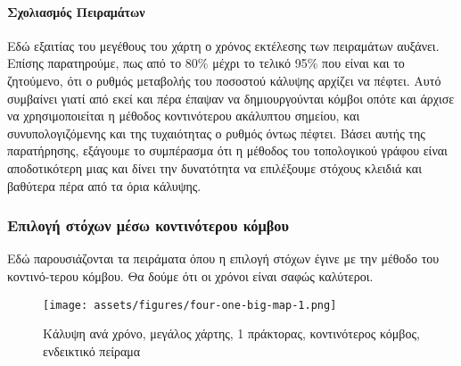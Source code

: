\paragraph{Σχολιασμός Πειραμάτων}

Εδώ εξαιτίας του μεγέθους του χάρτη ο χρόνος εκτέλεσης των πειραμάτων αυξάνει. Επίσης παρατηρούμε, πως από το 80\% μέχρι το τελικό 95\% που είναι και το ζητούμενο, ότι ο ρυθμός μεταβολής του ποσοστού κάλυψης αρχίζει να πέφτει. Αυτό συμβαίνει γιατί από εκεί και πέρα έπαψαν να δημιουργούνται κόμβοι οπότε και άρχισε να χρησιμοποιείται η μέθοδος κοντινότερου ακάλυπτου σημείου, και συνυπολογιζόμενης και της τυχαιότητας ο ρυθμός όντως πέφτει. Βάσει αυτής της παρατήρησης, εξάγουμε το συμπέρασμα ότι η μέθοδος του τοπολογικού γράφου είναι αποδοτικότερη μιας και δίνει την δυνατότητα να επιλέξουμε στόχους κλειδιά και βαθύτερα πέρα από τα όρια κάλυψης.



\subsubsection{Επιλογή στόχων μέσω κοντινότερου κόμβου}

Εδώ παρουσιάζονται τα πειράματα όπου η επιλογή στόχων έγινε με την μέθοδο του κοντινό-τερου κόμβου. Θα δούμε ότι οι χρόνοι είναι σαφώς καλύτεροι. 


\begin{figure}[!h]	
	\texttt{[image: assets/figures/four-one-big-map-1.png]}
	\caption{Κάλυψη ανά χρόνο, μεγάλος χάρτης, 1 πράκτορας, κοντινότερος κόμβος, ενδεικτικό πείραμα}
\end{figure}




